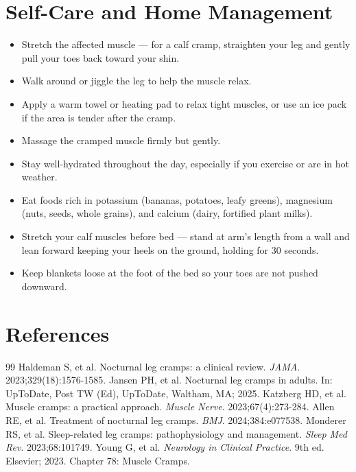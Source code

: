 \section*{Self-Care and Home Management}
\begin{itemize}
  \item Stretch the affected muscle — for a calf cramp, straighten your leg and gently pull your toes back toward your shin.
  \item Walk around or jiggle the leg to help the muscle relax.
  \item Apply a warm towel or heating pad to relax tight muscles, or use an ice pack if the area is tender after the cramp.
  \item Massage the cramped muscle firmly but gently.
  \item Stay well-hydrated throughout the day, especially if you exercise or are in hot weather.
  \item Eat foods rich in potassium (bananas, potatoes, leafy greens), magnesium (nuts, seeds, whole grains), and calcium (dairy, fortified plant milks).
  \item Stretch your calf muscles before bed — stand at arm's length from a wall and lean forward keeping your heels on the ground, holding for 30 seconds.
  \item Keep blankets loose at the foot of the bed so your toes are not pushed downward.
\end{itemize}

\section*{References}

\begin{thebibliography}{99}
 Haldeman S, et al. Nocturnal leg cramps: a clinical review. \emph{JAMA}. 2023;329(18):1576-1585.
 Jansen PH, et al. Nocturnal leg cramps in adults. In: UpToDate, Post TW (Ed), UpToDate, Waltham, MA; 2025.
 Katzberg HD, et al. Muscle cramps: a practical approach. \emph{Muscle Nerve}. 2023;67(4):273-284.
 Allen RE, et al. Treatment of nocturnal leg cramps. \emph{BMJ}. 2024;384:e077538.
 Monderer RS, et al. Sleep-related leg cramps: pathophysiology and management. \emph{Sleep Med Rev}. 2023;68:101749.
 Young G, et al. \emph{Neurology in Clinical Practice}. 9th ed. Elsevier; 2023. Chapter 78: Muscle Cramps.
\end{thebibliography}
